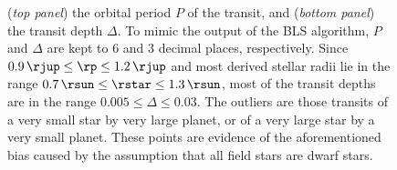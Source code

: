 \begin{figure}
\begin{center}
{({\it top panel}) the orbital period $P$ of the transit, and %
({\it bottom panel}) the transit depth $\Delta$.
To mimic the output of the BLS algorithm, $P$ and $\Delta$ are kept to 6 and 3 decimal places, respectively.
Since \mbox{$0.9\,\rjup \leq \rp \leq 1.2\,\rjup$} and most derived stellar radii lie in the range \mbox{$0.7\,\rsun \leq \rstar \leq 1.3\,\rsun$}, most of the transit depths are in the range \mbox{$0.005 \leq \Delta \leq 0.03$}.
The outliers are those transits of a very small star by very large planet, or of a very large star by a very small planet.
These points are evidence of the aforementioned bias caused by the assumption that all field stars are dwarf stars. %
}
\label{cha:human:sec:model:fig:bls1}
\end{center}
\end{figure}

